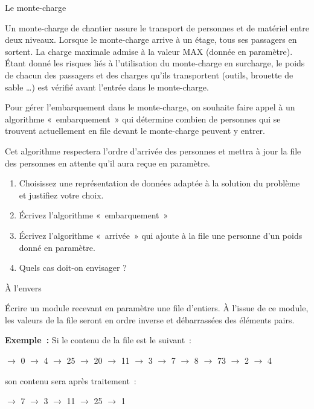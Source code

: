 	\begin{Exercice}{Le monte-charge}
		
		Un monte-charge de chantier assure le transport de personnes 
		et de matériel entre deux niveaux. Lorsque le monte-charge
		arrive à un étage, tous ses passagers en sortent. La charge
		maximale admise à la valeur MAX (donnée en paramètre).
		Étant donné les risques liés à l'utilisation du monte-charge 
		en surcharge, le poids de chacun des passagers et des
		charges qu'ils transportent (outils, brouette de sable {\dots}) 
		est vérifié avant l'entrée dans le monte-charge.

		Pour gérer l'embarquement dans le monte-charge, on souhaite 
		faire appel à un algorithme «~embarquement~» qui détermine
		combien de personnes qui se trouvent actuellement 
		en file devant le monte-charge peuvent y entrer.

		Cet algorithme respectera l'ordre d'arrivée des personnes 
		et mettra à jour la file des personnes en attente qu'il aura
		reçue en paramètre.

		\begin{enumerate}
			\item {
				Choisissez une représentation de données adaptée à la solution du problème et justifiez votre choix. }
			\item {
				Écrivez l'algorithme «~embarquement~»}
			\item {
				Écrivez l'algorithme «~arrivée~» qui ajoute à la file une personne d'un poids donné en paramètre.}
			\item {
				Quels cas doit-on envisager ?}
		\end{enumerate}

	\end{Exercice}

	\begin{Exercice}{À l'envers}
	
		Écrire un module recevant en paramètre une file d'entiers. 
		À l'issue de ce module, les valeurs de la file seront en
		ordre inverse et débarrassées des éléments pairs.

		\textbf{Exemple~:} Si le contenu de la file est le suivant~:

		{ $\rightarrow $ 0 $\rightarrow $ 4 
		$\rightarrow $ 25 $\rightarrow $ 20 
		$\rightarrow $ 11 $\rightarrow $ 3 $\rightarrow
		$ 7 $\rightarrow $ 8 $\rightarrow $ 73 
		$\rightarrow $ 2 $\rightarrow $ 4
		\par}

		son contenu sera après traitement~: 

		{ $\rightarrow $ 7 $\rightarrow $ 3 $\rightarrow 
		$ 11 $\rightarrow $ 25 $\rightarrow $ 1
		\par}

\end{Exercice}
	
		